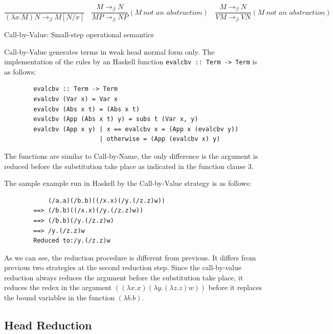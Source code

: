 \begin{equation*}
\frac{}{(\lambda x.M)N \rightarrow _\beta M[N/x]}\ \ \ \  
\frac{M \rightarrow _\beta N}{MP \rightarrow _\beta NP}(M\ \textit{not an abstraction})\ \ \ \
\frac{M \rightarrow _\beta N}{VM \rightarrow _\beta VN}(M\ \textit{not an abstraction})\ \ \ 
\end{equation*}
\begin{center}
Call-by-Value: Small-step operational semantics
\end{center}

Call-by-Value generates terms in weak head normal form only. The implementation of the rules by an Haskell function \verb|evalcbv :: Term -> Term| is as follows:

\begin{verbatim}
        evalcbv :: Term -> Term
        evalcbv (Var x) = Var x
        evalcbv (Abs x t) = (Abs x t)
        evalcbv (App (Abs x t) y) = subs t (Var x, y)
        evalcbv (App x y) | x == evalcbv x = (App x (evalcbv y))
                          | otherwise = (App (evalcbv x) y)  
\end{verbatim}

The functions are similar to Call-by-Name, the only difference is the argument is reduced before the substitution take place as indicated in the function clause 3.

\begin{exmp}
\normalfont The sample example run in Haskell by the Call-by-Value strategy is as follows:
\end{exmp}

\begin{verbatim}
            (/a.a)(/b.b)((/x.x)(/y.(/z.z)w))
        ==> (/b.b)((/x.x)(/y.(/z.z)w))
        ==> (/b.b)(/y.(/z.z)w)
        ==> /y.(/z.z)w
        Reduced to:/y.(/z.z)w
\end{verbatim}

As we can see, the reduction procedure is different from previous. It differs from previous two strategies at the second reduction step. Since the call-by-value reduction always reduces the argument before the substitution take place, it reduces the redex in the argument $((\lambda x.x)(\lambda y.(\lambda z.z)w))$ before it replaces the bound variables in the function $(\lambda b.b)$.    


\subsection{Head Reduction}

